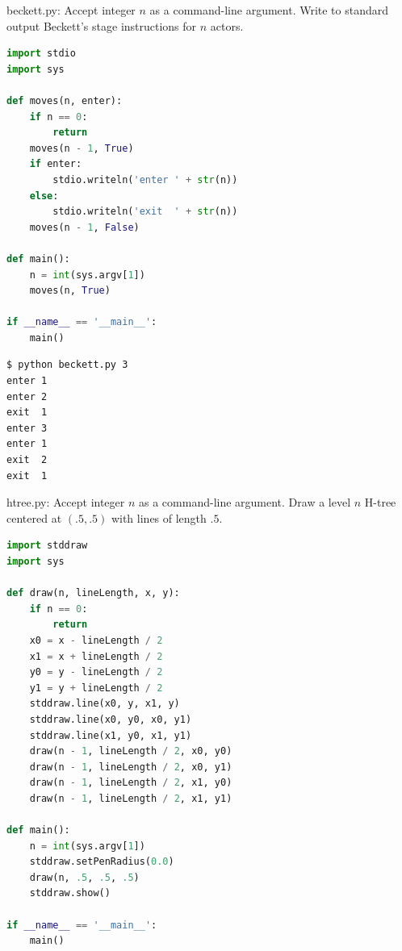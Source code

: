 \documentclass[8pt,a4paper,compress,handout]{beamer}
\begin{document}
\begin{frame}[fragile]
\begin{framed}
\tiny beckett.py: Accept integer $n$ as a command-line argument. Write to standard output Beckett's stage instructions for $n$ actors.
\end{framed}

\begin{lstlisting}[language=Python]
import stdio
import sys

def moves(n, enter):
    if n == 0:
        return
    moves(n - 1, True)
    if enter:
        stdio.writeln('enter ' + str(n))
    else:
        stdio.writeln('exit  ' + str(n))
    moves(n - 1, False)

def main():
    n = int(sys.argv[1])
    moves(n, True)

if __name__ == '__main__':
    main()
\end{lstlisting}

\begin{lstlisting}[language={}]
$ python beckett.py 3
enter 1
enter 2
exit  1
enter 3
enter 1
exit  2
exit  1
\end{lstlisting}
\end{frame}

\begin{frame}[fragile]
\begin{framed}
\tiny htree.py: Accept integer $n$ as a command-line argument. Draw a level $n$ H-tree centered at $(.5, .5)$ with lines of length $.5$.
\end{framed}

\begin{lstlisting}[language=Python]
import stddraw
import sys

def draw(n, lineLength, x, y):
    if n == 0:
        return
    x0 = x - lineLength / 2
    x1 = x + lineLength / 2
    y0 = y - lineLength / 2
    y1 = y + lineLength / 2
    stddraw.line(x0, y, x1, y)
    stddraw.line(x0, y0, x0, y1)
    stddraw.line(x1, y0, x1, y1)
    draw(n - 1, lineLength / 2, x0, y0)
    draw(n - 1, lineLength / 2, x0, y1)
    draw(n - 1, lineLength / 2, x1, y0)
    draw(n - 1, lineLength / 2, x1, y1)

def main():
    n = int(sys.argv[1])
    stddraw.setPenRadius(0.0)
    draw(n, .5, .5, .5)
    stddraw.show()

if __name__ == '__main__':
    main()
\end{lstlisting}
\end{frame}
\end{document}
